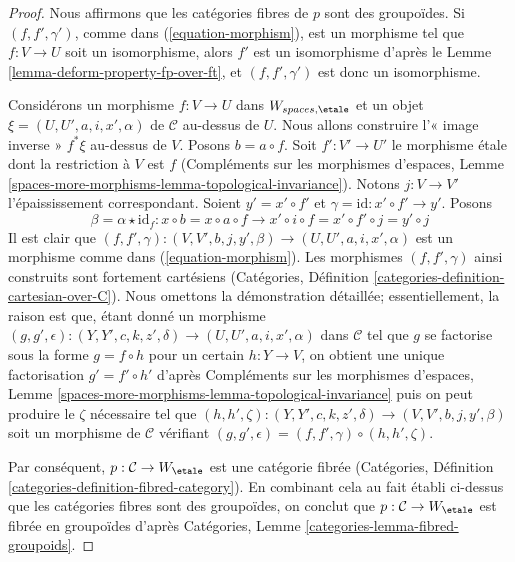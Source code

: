 \begin{proof}
Nous affirmons que les catégories fibres de $p$ sont des groupoïdes.
Si $(f, f', \gamma')$, comme dans (\ref{equation-morphism}),
est un morphisme tel que $f : V \to U$ soit un isomorphisme, alors
$f'$ est un isomorphisme d'après le Lemme \ref{lemma-deform-property-fp-over-ft},
et $(f, f', \gamma')$ est donc un isomorphisme.

\medskip\noindent
Considérons un morphisme $f : V \to U$ dans $W_{spaces, \etale}$
et un objet $\xi = (U, U', a, i, x', \alpha)$
de $\mathcal{C}$ au-dessus de $U$. Nous allons construire l'« image inverse »
$f^*\xi$ au-dessus de $V$.
Posons $b = a \circ f$. Soit $f' : V' \to U'$ le morphisme \'etale
dont la restriction à $V$ est $f$ (Compléments sur les morphismes d'espaces,
Lemme \ref{spaces-more-morphisms-lemma-topological-invariance}).
Notons $j : V \to V'$ l'épaississement correspondant.
Soient $y' = x' \circ f'$ et $\gamma = \text{id} : x' \circ f' \to y'$.
Posons
$$
\beta = \alpha \star \text{id}_f :
x \circ b = x \circ a \circ f \to
x' \circ i \circ f = x' \circ f' \circ j = y' \circ j
$$
Il est clair que $(f, f', \gamma) : (V, V', b, j, y', \beta) \to
(U, U', a, i, x', \alpha)$ est un morphisme comme dans
(\ref{equation-morphism}). Les morphismes $(f, f', \gamma)$
ainsi construits sont fortement cartésiens
(Catégories, Définition \ref{categories-definition-cartesian-over-C}).
Nous omettons la démonstration détaillée; essentiellement, la raison est que,
étant donné un morphisme
$(g, g', \epsilon) : (Y, Y', c, k, z', \delta) \to (U, U', a, i, x', \alpha)$
dans $\mathcal{C}$ tel que $g$ se factorise sous la forme $g = f \circ h$ pour un certain
$h : Y \to V$, on obtient une unique factorisation $g' = f' \circ h'$
d'après Compléments sur les morphismes d'espaces,
Lemme \ref{spaces-more-morphisms-lemma-topological-invariance}
puis on peut produire le $\zeta$ nécessaire tel que
$(h, h', \zeta) :  (Y, Y', c, k, z', \delta) \to
(V, V', b, j, y', \beta)$ soit un morphisme de $\mathcal{C}$
vérifiant $(g, g', \epsilon) = (f, f', \gamma) \circ (h, h', \zeta)$.

\medskip\noindent
Par conséquent, $p : \mathcal{C} \to W_\etale$ est une catégorie
fibrée (Catégories, Définition \ref{categories-definition-fibred-category}).
En combinant cela au fait établi ci-dessus que les catégories fibres sont des groupoïdes,
on conclut que $p : \mathcal{C} \to W_\etale$ est
fibrée en groupoïdes d'après Catégories, Lemme
\ref{categories-lemma-fibred-groupoids}.
\end{proof}

